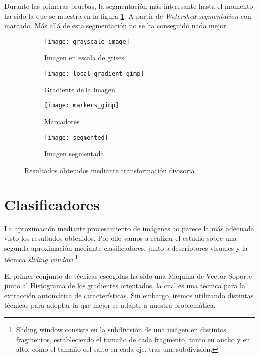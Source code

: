 Durante las primeras pruebas, la segmentación más interesante hasta el momento ha sido la que se muestra en la figura \ref{fig:5.1.3}. A partir de \textit{Watershed segmentation} con marcado. Más allá de esta segmentación no se ha conseguido nada mejor.

\begin{figure}
	\centering
	\begin{subfigure}[b]{0.45\textwidth}
        \texttt{[image: grayscale\_image]}
        \caption{Imagen en escala de grises}
    \end{subfigure}
    \begin{subfigure}[b]{0.45\textwidth}
        \texttt{[image: local\_gradient\_gimp]}
        \caption{Gradiente de la imagen}
    \end{subfigure}
    \begin{subfigure}[b]{0.45\textwidth}
        \texttt{[image: markers\_gimp]}
        \caption{Marcadores}
    \end{subfigure}
        \begin{subfigure}[b]{0.45\textwidth}
        \texttt{[image: segmented]}
        \caption{Imagen segmentada}
    \end{subfigure}
        \caption{Resultados obtenidos mediante transformación divisoria}
	\label{fig:5.1.3}
\end{figure} 	

\section{Clasificadores}

La aproximación mediante procesamiento de imágenes no parece la más adecuada visto los resultados obtenidos. Por ello vamos a realizar el estudio sobre una segunda aproximación  mediante clasificadores, junto a descriptores visuales y la técnica \textit{sliding window} \footnote{Sliding window consiste en la subdivisión de una imágen en distintos fragmentos, estableciendo el tamaño de cada fragmento, tanto en ancho y en alto, como el tamaño del salto en cada eje, tras una subdivisión.}.

El primer conjunto de técnicas escogidas ha sido una Máquina de Vector Soporte junto al Histograma de los gradientes orientados, la cual es una técnica para la extracción automática de características. Sin embargo, iremos utilizando distintas técnicas para adoptar la que mejor se adapte a nuestra problemática.

